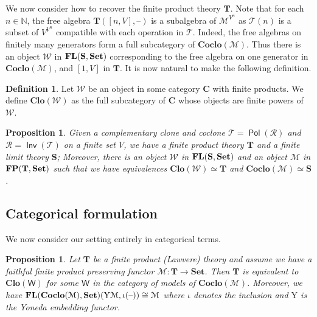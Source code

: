 \documentclass[11pt, a4paper, twoside,leqno]{amsart}
\newcommand{\cat}[1]{\mathbf{#1}}
\newcommand{\thg}{{\mathord{\text{--}}}}
\numberwithin{equation}{section}
\theoremstyle{plain}
\newtheorem{Prop}[Thm]{Proposition}
\theoremstyle{definition}
\newtheorem{Defn}[Thm]{Definition}
\newcommand{\Set}{\cat{Set}}
\DeclareMathOperator{\FP}{\bf FP}
\DeclareMathOperator{\FL}{\bf FL}
\DeclareMathOperator{\Pol}{\mathsf{Pol}}
\DeclareMathOperator{\Inv}{\mathsf{Inv}}
\begin{document}
We now consider how to recover the finite product theory \(\cat{T}\). Note that for each \(n\in \mathbb{N}
\), the free algebra \(\cat{T}([n,V],\thg)\) is a subalgebra of
\(\mathcal{M}^{V^{n}}\) as \(\mathscr{T}(n)
\) is a subset of \(V^{V^{n}}\) compatible with each operation in \(\mathscr{T}
\). Indeed, the free algebras on
finitely many generators form a full subcategory of \(\cat{Coclo}(\mathcal{M})\). Thus there is an
object \(\mathcal{W}\) in \(\FL(\cat{S}, \cat{Set})\) corresponding
to the free algebra on one generator in
\(\cat{Coclo}(\mathcal{M})\), and \([1,V]\) in \(\cat{T}\). It is now
natural to make the following definition.

\begin{Defn}
  \label{def:clone-of-obj}
  Let \(\mathcal{W}\) be an object in some category \(\cat{C}\) with finite
  products. We define \(\cat{Clo(\mathcal{W})}\) as the full subcategory of
  \(\cat{C}\) whose objects are finite powers of \(\mathcal{W}\).
\end{Defn}

\begin{Prop}
  \label{prop:clo-coclo-equiv}
  Given a complementary clone and coclone \(\mathscr{T} = \Pol(\mathscr{R}
  )
  \) and \(\mathscr{R} = \Inv(\mathscr{T}
  )\) on a finite set \(V\), we have a finite product
  theory \(\cat{T}\) and a finite limit theory \(\cat{S}\); Moreover, there is
  an object \(\mathcal{W}\) in \(\FL(\cat{S},\Set)\) and an object
  \(\mathcal{M}\) in \(\FP(\cat{T}, \cat{Set})\) such
  that we have equivalences \(\cat{Clo(\mathcal{W})} \simeq \cat{T}\) and
  \(\cat{Coclo(\mathcal{M})} \simeq \cat{S}\).
\end{Prop}

\subsection{Categorical formulation}
\label{sec:categ-form}

We now consider our setting entirely in categorical terms.

\begin{Prop}
  \label{prop:ct-concr-clo}
  Let \(\cat{T}\) be a finite product (Lawvere) theory and assume we
  have a
faithful finite product preserving functor \(\mathcal{M} \colon
\cat{T} \rightarrow \Set\).
Then \(\cat{T}\) is equivalent to \(\cat{Clo}(\mathsf{W})\) for some
\(\mathsf{W}\) in the category
of models of \(\cat{Coclo}(\mathcal{M})\). Moreover, we have 
\(\FL(\cat{Coclo}(\mathcal{M}),\Set)( \mathrm{Y}
  \mathcal{M}, \iota(\thg)) \cong \mathcal{M}\) where \(\iota\)
  denotes the inclusion and \(\mathrm{Y}
  \) is the Yoneda embedding functor.
\end{Prop}
\end{document}
